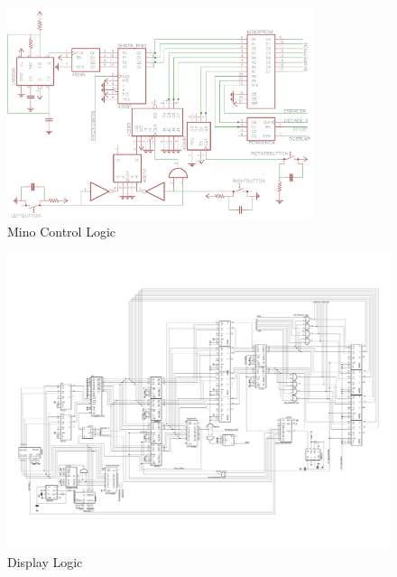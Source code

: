 \documentclass[letterpaper,titlepage,oneside]{article}
\begin{document}
\begin{center}
\begin{figure}[h]
\centering
\includegraphics[width = 0.8\textwidth]{Circuit Diagrams/MinoControl.png}
\caption{Mino Control Logic}
\label{fig:Mino Control}
\end{figure}
\end{center}

\begin{center}
\begin{figure}[hp]
\includegraphics[angle = 90,width = 1\textwidth]{Circuit Diagrams/Display.png}
\caption{Display Logic}
\label{fig:Display}
\end{figure}
\end{center}
\end{document}

